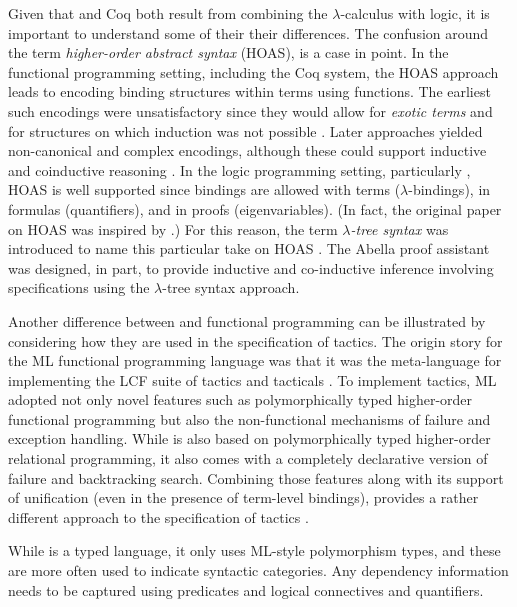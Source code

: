 Given that \lP and Coq both result from combining the
$\lambda$-calculus with logic, it is important to understand some of
their their differences.  The confusion around the term
\emph{higher-order abstract syntax} (HOAS), is a case in point.  In
the functional programming setting, including the Coq system, the HOAS
approach leads to encoding binding structures within terms using
functions.  The earliest such encodings were unsatisfactory since they
would allow for \emph{exotic terms} \cite{despeyroux95tlca} and for
structures on which induction was not possible \cite{roeckl01fossacs}.
Later approaches yielded non-canonical and complex encodings, although
these could support inductive and coinductive reasoning
\cite{chlipala08icfp,honsell01tcs,pientka10ijcar}. 
In the logic programming setting, particularly \lP, HOAS is well
supported since bindings are allowed with terms ($\lambda$-bindings),
in formulas (quantifiers), and in proofs (eigenvariables).  (In fact,
the original paper on HOAS \cite{pfenning88pldi} was inspired by \lP.)
For this reason, the term \emph{$\lambda$-tree syntax} was introduced
to name this particular take on HOAS \cite{miller19jar}.  The Abella
proof assistant \cite{baelde14jfr} was designed, in part, to provide
inductive and co-inductive inference involving specifications using
the $\lambda$-tree syntax approach.

Another difference between \lP and functional programming can be
illustrated by considering how they are used in the specification of
tactics.  The origin story for the ML functional programming
language was that it was the meta-language for implementing the LCF
suite of tactics and tacticals \cite{gordon79}.  To implement tactics,
ML adopted not only novel features such as polymorphically typed
higher-order functional programming but also the non-functional
mechanisms of failure and exception handling.  While \lP is also based
on polymorphically typed higher-order relational programming, it also
comes with a completely declarative version of failure and
backtracking search.  Combining those features along with its support
of unification (even in the presence of term-level bindings), \lP
provides a rather different approach to the specification of tactics
\cite{felty93jar}.

While \lP is a typed language, it only uses ML-style polymorphism
types, and these are more often used to indicate syntactic categories.
Any dependency information needs to be captured using predicates and
logical connectives and quantifiers.

